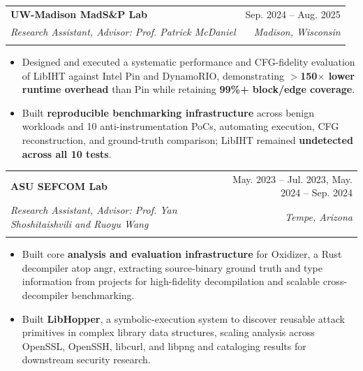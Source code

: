 \documentclass[letterpaper,10pt]{article}
\makeatletter
\newcommand{\resumeItem}[1]{
  \item\small{
    {#1 \vspace{-2pt}}
  }
}
\newcommand{\resumeSubheading}[4]{
  \vspace{-4pt}\item
    \begin{tabular*}{0.97\textwidth}[t]{l@{\extracolsep{\fill}}r}
      \textbf{#1} & #2 \\
      \if\relax\detokenize{#3#4}\relax\else
        \textit{\small#3} & \textit{\small #4} \\
      \fi
    \end{tabular*}\vspace{-7pt}
}
\newcommand{\resumeSubHeadingListStart}{\begin{itemize}[leftmargin=0.15in, label={}]}
\newcommand{\resumeSubHeadingListEnd}{\end{itemize}}
\newcommand{\resumeItemListStart}{\begin{itemize}[leftmargin=0.15in]}
\newcommand{\resumeItemListEnd}{\end{itemize}\vspace{-3pt}}
\makeatother
\begin{document}



\resumeSubheading
{UW-Madison MadS\&P Lab}{Sep. 2024 -- Aug. 2025}
{Research Assistant, Advisor: Prof. Patrick McDaniel}{Madison, Wisconsin}
\resumeItemListStart
\resumeItem{
Designed and executed a systematic performance and CFG-fidelity evaluation of LibIHT against Intel Pin and DynamoRIO, demonstrating \textbf{$>$150$\times$ lower runtime overhead} than Pin while retaining \textbf{99\%+ block/edge coverage}.
}
\resumeItem{
Built \textbf{reproducible benchmarking infrastructure} across benign workloads and 10 anti-instrumentation PoCs, automating execution, CFG reconstruction, and ground-truth comparison; LibIHT remained \textbf{undetected across all 10 tests}.
}
\resumeItemListEnd

\resumeSubheading
{ASU SEFCOM Lab}{May. 2023 -- Jul. 2023, May. 2024 -- Sep. 2024}
{Research Assistant, Advisor: Prof. Yan Shoshitaishvili and Ruoyu Wang}{Tempe, Arizona}
\resumeItemListStart
\resumeItem{
  Built core \textbf{analysis and evaluation infrastructure} for Oxidizer, a Rust decompiler atop angr, extracting source-binary ground truth and type information from projects for high-fidelity decompilation and scalable cross-decompiler benchmarking.
}
\resumeItem{
  Built \textbf{LibHopper}, a symbolic-execution system to discover reusable attack primitives in complex library data structures, scaling analysis across OpenSSL, OpenSSH, libcurl, and libpng and cataloging results for downstream security research.
}

\resumeItemListEnd
\end{document}
